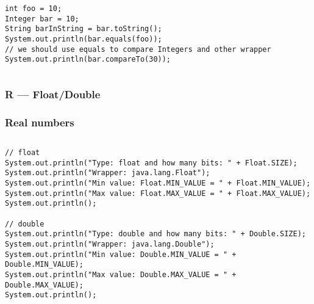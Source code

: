 \documentclass[en, 11pt, xcolor=dvipsnames]{beamer}
\begin{document}
\begin{frame}[fragile]
\begin{columns}[c]
\begin{column}{0.9\textwidth}
			\begin{lstlisting}[style=Java]
int foo = 10;
Integer bar = 10;
String barInString = bar.toString();
System.out.println(bar.equals(foo));
// we should use equals to compare Integers and other wrapper
System.out.println(bar.compareTo(30));\end{lstlisting}

		\end{column}
	\end{columns}

\end{frame}

\subsubsection{R --- Float/Double}
\begin{frame}[fragile]
	\frametitle{Real numbers}


	\begin{columns}[c]
		\begin{column}{0.9\textwidth}

			\begin{lstlisting}[style=Java]
// float
System.out.println("Type: float and how many bits: " + Float.SIZE);
System.out.println("Wrapper: java.lang.Float");
System.out.println("Min value: Float.MIN_VALUE = " + Float.MIN_VALUE);
System.out.println("Max value: Float.MAX_VALUE = " + Float.MAX_VALUE);
System.out.println();

// double
System.out.println("Type: double and how many bits: " + Double.SIZE);
System.out.println("Wrapper: java.lang.Double");
System.out.println("Min value: Double.MIN_VALUE = " + Double.MIN_VALUE);
System.out.println("Max value: Double.MAX_VALUE = " + Double.MAX_VALUE);
System.out.println(); \end{lstlisting}

		\end{column}
	\end{columns}

\end{frame}
\end{document}
